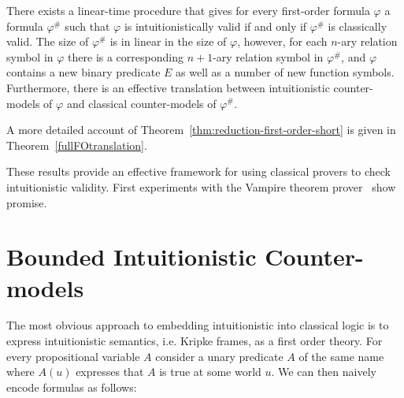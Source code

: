 \documentclass[runningheads]{llncs}
\begin{document}
\begin{theorem}
\label{thm:reduction-first-order-short}
There exists a linear-time procedure that gives for every first-order formula $\varphi$ a formula $\varphi^\#$ such that $\varphi$ is intuitionistically valid if and only if $\varphi^\#$ is classically valid. The size of $\varphi^\#$ is in linear in the size of $\varphi$, however, for each $n$-ary relation symbol in $\varphi$ there is a corresponding $n+1$-ary relation symbol in $\varphi^\#$, and $\varphi$ contains a new binary predicate $E$ as well as a number of new function symbols. Furthermore, there is an effective translation between intuitionistic counter-models of $\varphi$ and classical counter-models of $\varphi^\#$.
\end{theorem}
A more detailed account of Theorem~\ref{thm:reduction-first-order-short} is given in Theorem~\ref{fullFOtranslation}.

These results provide an effective framework for using classical provers to check intuitionistic validity. First experiments with the Vampire theorem prover~\cite{kovacs2013first} show promise.




\section{Bounded Intuitionistic Counter-models}

The most obvious approach to embedding intuitionistic into classical logic is to express intuitionistic semantics, i.e. Kripke frames, as a first order theory. For every propositional variable $A$ consider a unary predicate $A$ of the same name where $A(u)$ expresses that $A$ is true at some world $u$. We can then naively encode formulas as follows:
\end{document}
